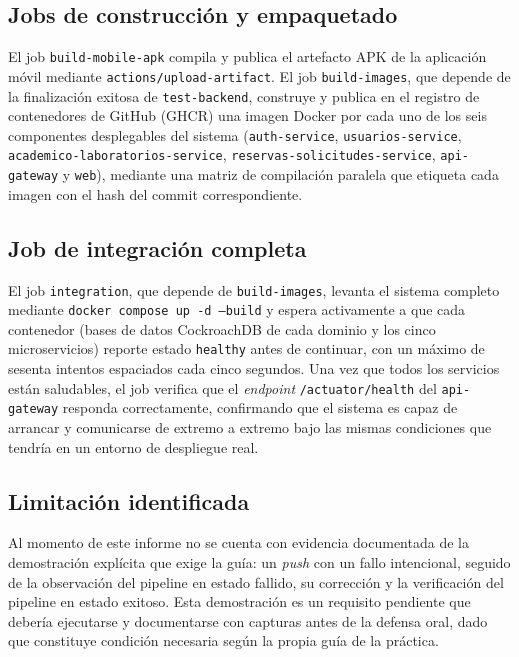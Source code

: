 \documentclass[11pt,a4paper]{article}
\begin{document}
\subsection{Jobs de construcción y empaquetado}

El job \texttt{build-mobile-apk} compila y publica el artefacto APK de
la aplicación móvil mediante \texttt{actions/upload-artifact}. El job
\texttt{build-images}, que depende de la finalización exitosa de
\texttt{test-backend}, construye y publica en el registro de
contenedores de GitHub (GHCR) una imagen Docker por cada uno de los seis
componentes desplegables del sistema (\texttt{auth-service},
\texttt{usuarios-service}, \texttt{academico-laboratorios-service},
\texttt{reservas-solicitudes-service}, \texttt{api-gateway} y
\texttt{web}), mediante una matriz de compilación paralela que etiqueta
cada imagen con el hash del commit correspondiente.

\subsection{Job de integración completa}

El job \texttt{integration}, que depende de \texttt{build-images},
levanta el sistema completo mediante \texttt{docker compose up -d
--build} y espera activamente a que cada contenedor (bases de datos
CockroachDB de cada dominio y los cinco microservicios) reporte estado
\texttt{healthy} antes de continuar, con un máximo de sesenta intentos
espaciados cada cinco segundos. Una vez que todos los servicios están
saludables, el job verifica que el \emph{endpoint}
\texttt{/actuator/health} del \texttt{api-gateway} responda
correctamente, confirmando que el sistema es capaz de arrancar y
comunicarse de extremo a extremo bajo las mismas condiciones que
tendría en un entorno de despliegue real.

\subsection{Limitación identificada}

Al momento de este informe no se cuenta con evidencia documentada de la
demostración explícita que exige la guía: un \emph{push} con un fallo
intencional, seguido de la observación del pipeline en estado fallido,
su corrección y la verificación del pipeline en estado exitoso. Esta
demostración es un requisito pendiente que debería ejecutarse y
documentarse con capturas antes de la defensa oral, dado que constituye
condición necesaria según la propia guía de la práctica.
\end{document}
